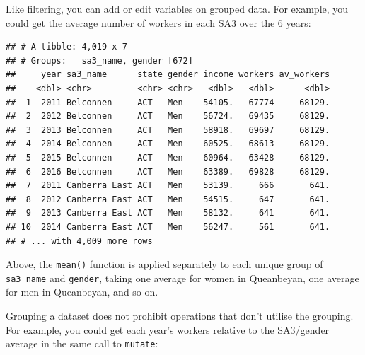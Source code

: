 \documentclass[]{book}
\newenvironment{Shaded}{\begin{snugshade}}{\end{snugshade}}
\newcommand{\DataTypeTok}[1]{\textcolor[rgb]{0.13,0.29,0.53}{#1}}
\newcommand{\KeywordTok}[1]{\textcolor[rgb]{0.13,0.29,0.53}{\textbf{#1}}}
\newcommand{\NormalTok}[1]{#1}
\newcommand{\OperatorTok}[1]{\textcolor[rgb]{0.81,0.36,0.00}{\textbf{#1}}}
\newcommand{\StringTok}[1]{\textcolor[rgb]{0.31,0.60,0.02}{#1}}
\begin{document}
Like filtering, you can add or edit variables on grouped data. For example, you could get the average number of workers in each SA3 over the 6 years:

\begin{Shaded}
\end{Shaded}

\begin{verbatim}
## # A tibble: 4,019 x 7
## # Groups:   sa3_name, gender [672]
##     year sa3_name      state gender income workers av_workers
##    <dbl> <chr>         <chr> <chr>   <dbl>   <dbl>      <dbl>
##  1  2011 Belconnen     ACT   Men    54105.   67774     68129.
##  2  2012 Belconnen     ACT   Men    56724.   69435     68129.
##  3  2013 Belconnen     ACT   Men    58918.   69697     68129.
##  4  2014 Belconnen     ACT   Men    60525.   68613     68129.
##  5  2015 Belconnen     ACT   Men    60964.   63428     68129.
##  6  2016 Belconnen     ACT   Men    63389.   69828     68129.
##  7  2011 Canberra East ACT   Men    53139.     666       641.
##  8  2012 Canberra East ACT   Men    54515.     647       641.
##  9  2013 Canberra East ACT   Men    58132.     641       641.
## 10  2014 Canberra East ACT   Men    56247.     561       641.
## # ... with 4,009 more rows
\end{verbatim}

Above, the \texttt{mean()} function is applied separately to each unique group of \texttt{sa3\_name} and \texttt{gender}, taking one average for women in Queanbeyan, one average for men in Queanbeyan, and so on.

Grouping a dataset does not prohibit operations that don't utilise the grouping. For example, you could get each year's workers relative to the SA3/gender average in the same call to \texttt{mutate}:

\begin{Shaded}
\end{Shaded}
\end{document}
